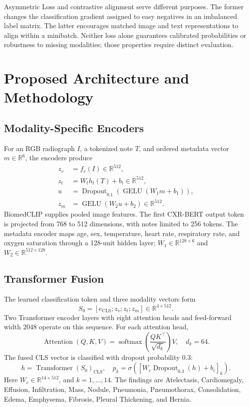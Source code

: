 \documentclass[conference,letterpaper]{IEEEtran}
\begin{document}
Asymmetric Loss and contrastive alignment serve different purposes. The former changes the classification gradient assigned to easy negatives in an imbalanced label matrix. The latter encourages matched image and text representations to align within a minibatch. Neither loss alone guarantees calibrated probabilities or robustness to missing modalities; those properties require distinct evaluation.

\section{Proposed Architecture and Methodology}
\subsection{Modality-Specific Encoders}
For an RGB radiograph $I$, a tokenized note $T$, and ordered metadata vector $m\in\mathbb{R}^{6}$, the encoders produce
\begin{align}
z_v &= f_v(I)\in\mathbb{R}^{512},\label{eq:vision}\\
z_t &= W_t h_t(T)+b_t\in\mathbb{R}^{512},\label{eq:text}\\
u &= \operatorname{Dropout}_{0.1}(\operatorname{GELU}(W_1m+b_1)),\label{eq:meta1}\\
z_m &= \operatorname{GELU}(W_2u+b_2)\in\mathbb{R}^{512}.\label{eq:meta2}
\end{align}
BiomedCLIP supplies pooled image features. The first CXR-BERT output token is projected from 768 to 512 dimensions, with notes limited to 256 tokens. The metadata encoder maps age, sex, temperature, heart rate, respiratory rate, and oxygen saturation through a 128-unit hidden layer; $W_1\in\mathbb{R}^{128\times6}$ and $W_2\in\mathbb{R}^{512\times128}$.

\subsection{Transformer Fusion}
The learned classification token and three modality vectors form
\begin{equation}
S_0=[e_{\mathrm{CLS}};z_v;z_t;z_m]\in\mathbb{R}^{4\times512}.
\end{equation}
Two Transformer encoder layers with eight attention heads and feed-forward width 2048 operate on this sequence. For each attention head,
\begin{equation}
\operatorname{Attention}(Q,K,V)=\operatorname{softmax}\left(\frac{QK^\top}{\sqrt{d_k}}\right)V,\quad d_k=64.
\end{equation}
The fused CLS vector is classified with dropout probability 0.3:
\begin{equation}
h=\operatorname{Transformer}(S_0)_{\mathrm{CLS}},\quad
p_k=\sigma\!\left([W_c\operatorname{Dropout}_{0.3}(h)+b_c]_k\right).
\end{equation}
Here $W_c\in\mathbb{R}^{14\times512}$, and $k=1,\ldots,14$. The findings are Atelectasis, Cardiomegaly, Effusion, Infiltration, Mass, Nodule, Pneumonia, Pneumothorax, Consolidation, Edema, Emphysema, Fibrosis, Pleural Thickening, and Hernia.
\end{document}
